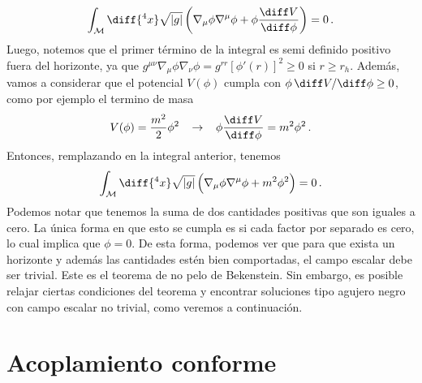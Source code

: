 \documentclass[../Main.tex]{subfiles}
\begin{document}
\begin{align}
\int_{\mathcal{M}}\diff{^4x}\sqrt{|g|}\left(\nabla_{\mu}\phi\nabla^{\mu}\phi+\phi\frac{\diff V}{\diff\phi}\right)=0\, .   
\end{align}
Luego, notemos que el primer término de la integral es semi definido positivo fuera del horizonte, ya que $g^{\mu\nu}\nabla_{\mu}\phi\nabla_{\nu}\phi=g^{rr}[\phi'(r)]^2\geq 0$ si $r\geq r_h$. Además, vamos a considerar que el potencial $V(\phi)$ cumpla con $\phi\,\diff V/\diff\phi\geq0$, como por ejemplo el termino de masa
\begin{align*}
V(\phi)=\frac{m^2}{2}\phi^2 \;\;\;\to\;\;\;\phi\frac{\diff V}{\diff\phi}=m^2\phi^2\, .
\end{align*}
Entonces, remplazando en la integral anterior, tenemos
\begin{align}
\int_{\mathcal{M}}\diff{^4x}\sqrt{|g|}\left(\nabla_{\mu}\phi\nabla^{\mu}\phi+m^2\phi^2\right)=0\, .
\end{align}
Podemos notar que tenemos la suma de dos cantidades positivas que son iguales a cero. La única forma en que esto se cumpla es si cada factor por separado es cero, lo cual implica que $\phi=0$. De esta forma, podemos ver que para que exista un horizonte y además las cantidades estén bien comportadas, el campo escalar debe ser trivial. Este es el teorema de no pelo de Bekenstein. Sin embargo, es posible relajar ciertas condiciones del teorema y encontrar soluciones tipo agujero negro con campo escalar no trivial, como veremos a continuación.




\section{Acoplamiento conforme}
\end{document}
